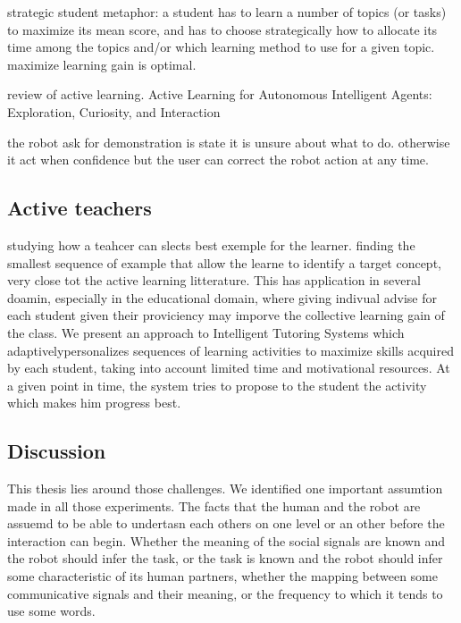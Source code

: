 \cite{lopes2012strategic} strategic student metaphor: a student has to learn a number of topics (or tasks) to maximize its mean score, and has to choose strategically how to allocate its time among the topics and/or which learning method to use for a given topic. maximize learning gain is optimal. 

\cite{lopes2014active} review of active learning. Active Learning for Autonomous Intelligent Agents: Exploration, Curiosity, and Interaction

\cite{chernova09jair} the robot ask for demonstration is state it is unsure about what to do. otherwise it act when confidence but the user can correct the robot action at any time.


\subsection{Active teachers}

\cite{cakmak2012algorithmic} studying how a teahcer can slects best exemple for the learner. finding the smallest sequence of example that allow the learne to identify a target concept, very close tot the active learning litterature. This has application in several doamin, especially in the educational domain, where giving indivual advise for each student given their proviciency may imporve the collective learning gain of the class. 
\cite{clement2014online} We present an approach to Intelligent Tutoring Systems which adaptivelypersonalizes sequences of learning activities to maximize skills acquired by each student, taking into account limited time and motivational resources. At a given point in time, the system tries to propose to the student the activity which makes him progress best.



\subsection{Discussion}

This thesis lies around those challenges. We identified one important assumtion made in all those experiments. The facts that the human and the robot are assuemd to be able to undertasn each others on one level or an other before the interaction can begin. Whether the meaning of the social signals are known and the robot should infer the task, or the task is known and the robot should infer some characteristic of its human partners, whether the mapping between some communicative signals and their meaning, or the frequency to which it tends to use some words.


